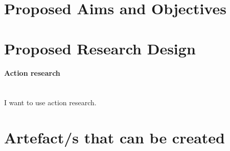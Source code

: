 \documentclass[12pt]{article}
\begin{document}
\section{Proposed Aims and Objectives}

\section{Proposed Research Design}
\paragraph{Action research}\mbox{} \\
I want to use action research.

\section{Artefact/s that can be created}

\printbibliography
\end{document}
